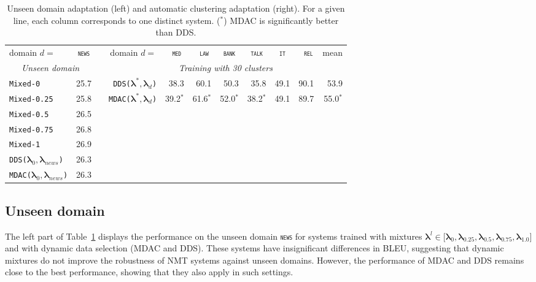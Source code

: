 \documentclass[11pt]{article}
\newcommand{\domain}[1]{\texttt{\textsc{#1}}}
\newcommand{\system}[1]{\texttt{{#1}}}
\newcommand{\vlambda}{\ensuremath{\boldsymbol\lambda}\xspace} %
\begin{document}
\begin{table}[htbp]
  \vspace{-2\baselineskip}
  \centering \small
  \begin{tabular}{|l|*{10}{r|}} \cline{1-2} \cline{4-11}
    domain \hfill $d=$ & \multicolumn{1}{c|}{\domain{news}}& \hfill &domain \hfill $d=$ & \multicolumn{1}{c|}{\domain{ med}} & \multicolumn{1}{c|}{\domain{ law}} & \multicolumn{1}{c|}{\domain{bank}} & \multicolumn{1}{c|}{\domain{talk}} & \multicolumn{1}{c|}{\domain{ it }} & \multicolumn{1}{c|}{\domain{ rel}} & \multicolumn{1}{c|}{mean}  \\ 
\cline{1-2} \cline{4-11}
    \multicolumn{2}{|c|}{\sl Unseen domain} & &\multicolumn{8}{c|}{\sl Training with 30 clusters} \\ 
\cline{1-2} \cline{4-11}
    \system{Mixed-0}      & 25.7 & &\system{DDS($\vlambda^*, \vlambda_d$)}&38.3&60.1&50.3&35.8&49.1&90.1&53.9\\
    \system{Mixed-0.25} & 25.8 & &\system{MDAC($\vlambda^*, \vlambda_d$)}&39.2$^*$&61.6$^*$&52.0$^*$&38.2$^*$&49.1&89.7&55.0$^*$\\ \cline{4-11}
    \system{Mixed-0.5}   &26.5\\
    \system{Mixed-0.75} &26.8\\
    \system{Mixed-1} &26.9 \\
    \cline{1-2}
     \system{DDS($\vlambda_0, \vlambda_{news}$)} &26.3 \\
     \system{MDAC($\vlambda_0, \vlambda_{news}$)} &26.3 \\
     \cline{1-2}
  \end{tabular}
  \caption{Unseen domain adaptation (left) and automatic clustering adaptation (right). For a given line, each column corresponds to one distinct system. ($^*$) MDAC is significantly better than DDS.}
  \label{tab:unsupervised-da}
\end{table}

\subsection{Unseen domain}\label{ssec:uda}
The left part of Table~\ref{tab:unsupervised-da} displays the performance on the unseen domain \domain{news} for systems trained with mixtures $\vlambda^l \in \big[ \vlambda_0, \vlambda_{0.25}, \vlambda_{0.5}, \vlambda_{0.75}, \vlambda_{1.0}\big]$ and with dynamic data selection (MDAC and DDS). These systems have insignificant differences in BLEU, suggesting that dynamic mixtures do not improve the robustness of NMT systems against unseen domains. However, the performance of MDAC and DDS remains close to the best performance, showing that they also apply in such settings. %
\end{document}
